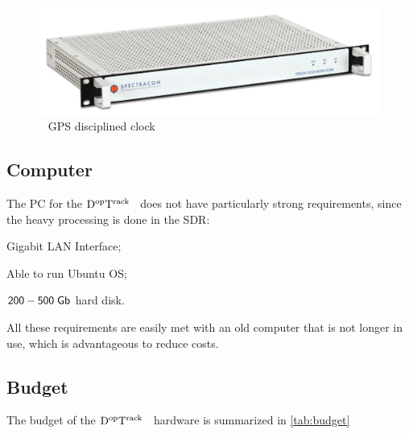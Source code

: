 \documentclass[11pt,a4paper,oneside]{article}
\newcommand{\GroundStationName}{${\rm D^{\rm op}T^{\rm rack}}$}
\newcommand{\fulltextwidth}{\textwidth}
\newcommand{\listskip}{0pt}
\newenvironment{itemize*}
{\begin{itemize}
  \setlength{\itemsep}{\listskip}
  \setlength{\parskip}{\listskip}
  \setlength{\parsep}{\listskip}}
{\end{itemize}}
\newcommand{\unit}[2]{$ {\sf #1}\thickspace{\sf #2}$}
\begin{document}
\begin{figure}[!ht]
\centering
\includegraphics[width=\fulltextwidth]{clock}
\caption{\modelclock ~ \acs{GPS} disciplined clock}
\label{fig:clock}
\end{figure}



\subsection{Computer}

The \ac{PC} for the \GroundStationName~ does not have particularly strong requirements, since the heavy processing is done in the \ac{SDR}:

\begin{itemize*}
\item Gigabit \ac{LAN} Interface;
\item Able to run Ubuntu \ac{OS};
\item \unit{200-500}{Gb} hard disk.
\end{itemize*}

All these requirements are easily met with an old computer that is not longer in use, which is advantageous to reduce costs.



\subsection{Budget}

The budget of the \GroundStationName~ hardware is summarized in \ref{tab:budget}
\end{document}
